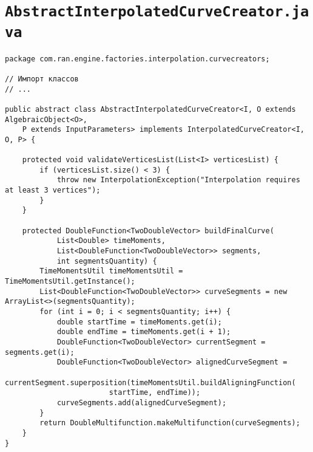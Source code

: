 \section*{\texttt{AbstractInterpolatedCurveCreator.java}}
\begin{verbatim}
package com.ran.engine.factories.interpolation.curvecreators;

// Импорт классов
// ...

public abstract class AbstractInterpolatedCurveCreator<I, O extends AlgebraicObject<O>,
    P extends InputParameters> implements InterpolatedCurveCreator<I, O, P> {

    protected void validateVerticesList(List<I> verticesList) {
        if (verticesList.size() < 3) {
            throw new InterpolationException("Interpolation requires at least 3 vertices");
        }
    }

    protected DoubleFunction<TwoDoubleVector> buildFinalCurve(
            List<Double> timeMoments,
            List<DoubleFunction<TwoDoubleVector>> segments,
            int segmentsQuantity) {
        TimeMomentsUtil timeMomentsUtil = TimeMomentsUtil.getInstance();
        List<DoubleFunction<TwoDoubleVector>> curveSegments = new ArrayList<>(segmentsQuantity);
        for (int i = 0; i < segmentsQuantity; i++) {
            double startTime = timeMoments.get(i);
            double endTime = timeMoments.get(i + 1);
            DoubleFunction<TwoDoubleVector> currentSegment = segments.get(i);
            DoubleFunction<TwoDoubleVector> alignedCurveSegment =
                    currentSegment.superposition(timeMomentsUtil.buildAligningFunction(
                        startTime, endTime));
            curveSegments.add(alignedCurveSegment);
        }
        return DoubleMultifunction.makeMultifunction(curveSegments);
    }
}
\end{verbatim}
